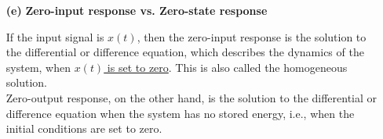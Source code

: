 \documentclass[a4paper, 12pt]{article}
\begin{document}
\begin{itemize}
\begin{itemize}
\item[\textbf{(e)}]{\textbf{Zero-input response vs. Zero-state response}}

\begin{tcolorbox}
If the input signal is $x(t)$, then the zero-input response is the solution to the differential or difference equation, which describes the dynamics of the system, when \underline{$x(t)$ is set to zero}. This is also called the homogeneous solution.\\

Zero-output response, on the other hand, is the solution to the differential or difference equation when the system has no stored energy, i.e., when the initial conditions are set to zero.
\end{tcolorbox}
\end{itemize}
\end{itemize}
\end{document}
